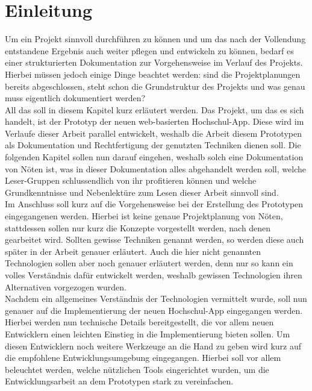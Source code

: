 \chapter{Einleitung}
\label{sec:einleitung}
Um ein Projekt sinnvoll durchführen zu können und um das nach der Vollendung entstandene Ergebnis auch weiter pflegen und entwickeln zu können, bedarf es einer strukturierten Dokumentation zur Vorgehensweise im Verlauf des Projekts. Hierbei müssen jedoch einige Dinge beachtet werden: sind die Projektplanungen bereits abgeschlossen, steht schon die Grundstruktur des Projekts und was genau muss eigentlich dokumentiert werden?\\
\linebreak
All das soll in diesem Kapitel kurz erläutert werden. Das Projekt, um das es sich handelt, ist der Prototyp der neuen web-basierten Hochschul-\ac{App}. Diese wird im Verlaufe dieser Arbeit parallel entwickelt, weshalb die Arbeit diesem Prototypen als Dokumentation und Rechtfertigung der genutzten Techniken dienen soll. Die folgenden Kapitel sollen nun darauf eingehen, weshalb solch eine Dokumentation von Nöten ist, was in dieser Dokumentation alles abgehandelt werden soll, welche Leser-Gruppen schlussendlich von ihr profitieren können und welche Grundkenntnisse und Nebenlektüre zum Lesen dieser Arbeit sinnvoll sind.\\
\linebreak
Im Anschluss soll kurz auf die Vorgehensweise bei der Erstellung des Prototypen eingegangenen werden. Hierbei ist keine genaue Projektplanung von Nöten, stattdessen sollen nur kurz die Konzepte vorgestellt werden, nach denen gearbeitet wird. Sollten gewisse Techniken genannt werden, so werden diese auch später in der Arbeit genauer erläutert. Auch die hier nicht genannten Technologien sollen aber noch genauer erläutert werden, denn nur so kann ein volles Verständnis dafür entwickelt werden, weshalb gewissen Technologien ihren Alternativen vorgezogen wurden.\\
\linebreak
Nachdem ein allgemeines Verständnis der Technologien vermittelt wurde, soll nun genauer auf die Implementierung der neuen Hochschul-\ac{App} eingegangen werden. Hierbei werden nun technische Details bereitgestellt, die vor allem neuen Entwicklern einen leichten Einstieg in die Implementierung bieten sollen. Um diesen Entwicklern noch weitere Werkzeuge an die Hand zu geben wird kurz auf die empfohlene Entwicklungsumgebung eingegangen. Hierbei soll vor allem beleuchtet werden, welche nützlichen Tools eingerichtet wurden, um die Entwicklungsarbeit an dem Prototypen stark zu vereinfachen.\\
